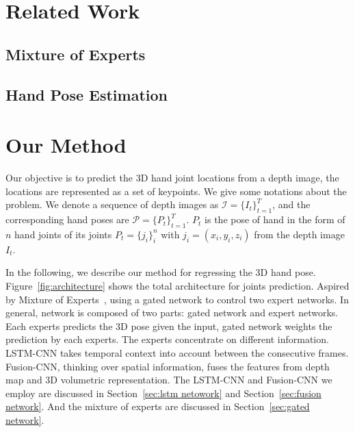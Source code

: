 \documentclass[journal,comsoc]{IEEEtran}
\begin{document}

\section{Related Work}\label{sec:related work}
\subsection{Mixture of Experts}
\subsection{Hand Pose Estimation}


\section{Our Method}\label{sec:our method}
Our objective is to predict the 3D hand joint locations from a depth image, the locations are represented as a set of keypoints. 
We give some notations about the problem. We denote a sequence of depth images as $\mathcal{I}=\{I_t\}_{t=1}^T$, 
and the corresponding hand poses are $\mathcal{P}=\{P_t\}_{t=1}^T$. $P_t$ is the pose of hand in the form of $n$ 
hand joints of its joints $P_t=\{j_i\}_i^n$ with $j_i=(x_i,y_i,z_i)$ from the depth image $I_t$.

In the following, we describe our method for regressing the 3D hand pose. Figure~\ref{fig:architecture} shows the total 
architecture for joints prediction. Aspired by Mixture of Experts~\cite{jacobs1991adaptive}, using a gated network to 
control two expert networks. In general, network is composed of two parts: gated network and expert networks. 
Each experts predicts the 3D pose given the input, gated network weights the prediction by each experts. 
The experts concentrate on different information. LSTM-CNN takes temporal context into account between the consecutive frames. 
Fusion-CNN, thinking over spatial information, fuses the features from depth map and 3D volumetric representation.
The LSTM-CNN and Fusion-CNN we employ are discussed in Section~\ref{sec:lstm netowork} and Section~\ref{sec:fusion network}. 
And the mixture of experts are discussed in Section~\ref{sec:gated network}.
\end{document}
